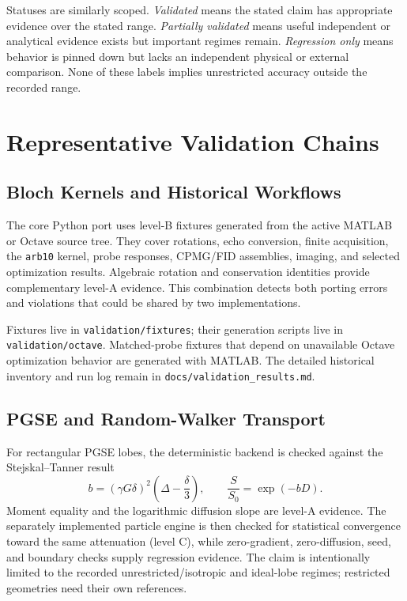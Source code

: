 \documentclass[11pt,oneside]{report}
\newcommand{\code}[1]{\texttt{#1}}
\begin{document}
Statuses are similarly scoped. \emph{Validated} means the stated claim has
appropriate evidence over the stated range. \emph{Partially validated} means
useful independent or analytical evidence exists but important regimes remain.
\emph{Regression only} means behavior is pinned down but lacks an independent
physical or external comparison. None of these labels implies unrestricted
accuracy outside the recorded range.

\section{Representative Validation Chains}

\subsection{Bloch Kernels and Historical Workflows}

The core Python port uses level-B fixtures generated from the active MATLAB or
Octave source tree. They cover rotations, echo conversion, finite acquisition,
the \code{arb10} kernel, probe responses, CPMG/FID assemblies, imaging, and
selected optimization results. Algebraic rotation and conservation identities
provide complementary level-A evidence. This combination detects both porting
errors and violations that could be shared by two implementations.

Fixtures live in \code{validation/fixtures}; their generation scripts live in
\code{validation/octave}. Matched-probe fixtures that depend on unavailable
Octave optimization behavior are generated with MATLAB. The detailed historical
inventory and run log remain in \code{docs/validation\_results.md}.

\subsection{PGSE and Random-Walker Transport}

For rectangular PGSE lobes, the deterministic backend is checked against the
Stejskal--Tanner result
\[
  b = (\gamma G\delta)^2\left(\Delta-\frac{\delta}{3}\right),
  \qquad \frac{S}{S_0}=\exp(-bD).
\]
Moment equality and the logarithmic diffusion slope are level-A evidence. The
separately implemented particle engine is then checked for statistical
convergence toward the same attenuation (level C), while zero-gradient,
zero-diffusion, seed, and boundary checks supply regression evidence. The claim
is intentionally limited to the recorded unrestricted/isotropic and ideal-lobe
regimes; restricted geometries need their own references.
\end{document}
